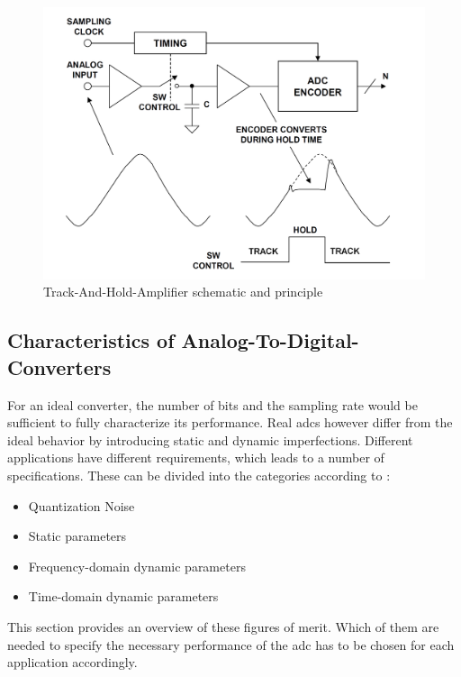\begin{figure}[tbh]
	\centering
	\includegraphics[width = \textwidth]{chap/02-theory/img/tha}
	\caption{Track-And-Hold-Amplifier schematic and principle \cite{walt}}
	\label{fig:tha}
\end{figure}

\subsection{Characteristics of Analog-To-Digital-Converters}\label{ssec:adc_charac}
For an ideal converter, the number of bits and the sampling rate would be sufficient to fully characterize its performance.
Real \glspl{adc} however differ from the ideal behavior by introducing static and dynamic imperfections.
Different applications have different requirements, which leads to a number of specifications.
These can be divided into the categories according to \cite{Lundberg}:
\begin{itemize}[noitemsep]
	\item Quantization Noise
	\item Static parameters
	\item Frequency-domain dynamic parameters
	\item Time-domain dynamic parameters
\end{itemize} %
This section provides an overview of these figures of merit.
Which of them are needed to specify the necessary performance of the \gls{adc} has to be chosen for each application accordingly.


